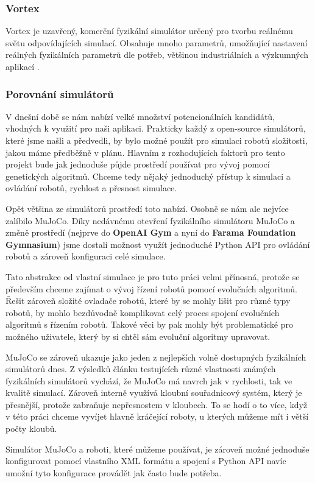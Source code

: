 \subsubsection{Vortex} \label{Vortex}
Vortex je uzavřený, komerční fyzikální simulátor určený pro tvorbu
reálnému světu odpovídajících simulací. Obsahuje mnoho parametrů,
umožňující nastavení reálných fyzikálních parametrů dle potřeb,
většinou industriálních a výzkumných aplikací \citep{coppeliarobotics}
\citep{yoon2023comparative}.

\subsubsection{Porovnání simulátorů} \label{Simulátory - Porovnání}
V dnešní době se nám nabízí velké množství potencionálních kandidátů, vhodných
k využití pro naši aplikaci. Prakticky každý z open-source simulátorů, které
jsme našli a předvedli, by bylo možné použít pro simulaci robotů složitosti,
jakou máme předběžně v plánu. Hlavním z rozhodujících faktorů pro tento projekt
bude jak jednoduše půjde prostředí používat pro vývoj pomocí genetických
algoritmů. Chceme tedy nějaký jednoduchý přístup k simulaci a ovládání robotů,
rychlost a přesnost simulace. 

Opět většina ze simulátorů prostředí toto nabízí. Osobně se nám ale nejvíce
zalíbilo MuJoCo. Díky nedávnému otevření fyzikálního simulátoru MuJoCo a změně
prostředí (nejprve do \textbf{OpenAI Gym} a nyní do \textbf{Farama Foundation
Gymnasium}) jsme dostali možnost využít jednoduché Python API pro ovládání
robotů a zároveň konfiguraci celé simulace. 

Tato abstrakce od vlastní simulace je pro tuto práci velmi přínosná, protože se
především chceme zajímat o vývoj řízení robotů pomocí evolučních algoritmů.
Řešit zároveň složité ovladače robotů, které by se mohly lišit pro různé typy
robotů, by mohlo bezdůvodně komplikovat celý proces spojení evolučních
algoritmů s řízením robotů. Takové věci by pak mohly být problematické pro
možného uživatele, který by si chtěl sám evoluční algoritmy upravovat.

MuJoCo se zároveň ukazuje jako jeden z nejlepších volně dostupných fyzikálních
simulátorů dnes. Z výsledků článku testujících různé vlastnosti známých fyzikálních
simulátorů \citet{erez2015simulation} vychází, že MuJoCo má navrch jak v
rychlosti, tak ve kvalitě simulací. Zároveň interně využívá kloubní
souřadnicový systém, který je přesnější, protože zabraňuje nepřesnostem v
kloubech. To se hodí o to více, když v této práci chceme vyvíjet hlavně
kráčející roboty, u kterých můžeme mít i větší počty kloubů. 

Simulátor MuJoCo a roboti, které můžeme používat, je zároveň možné
jednoduše konfigurovat pomocí vlastního XML formátu a spojení s Python API
navíc umožní tyto konfigurace provádět jak často bude potřeba.
